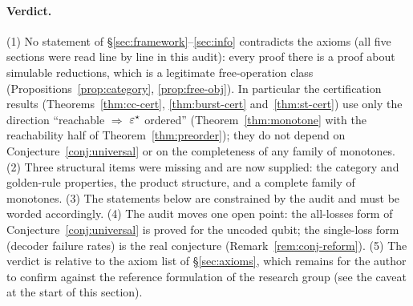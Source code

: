 \paragraph{Verdict.} (1) No statement of \S\ref{sec:framework}--\ref{sec:info} contradicts the axioms (all five sections were read line by line in this audit): every proof there is a proof about simulable reductions, which is a legitimate free-operation class (Propositions~\ref{prop:category}, \ref{prop:free-obj}). In particular the certification results (Theorems~\ref{thm:cc-cert}, \ref{thm:burst-cert} and~\ref{thm:st-cert}) use only the direction ``reachable $\Rightarrow$ $\varepsilon^{\star}$ ordered'' (Theorem~\ref{thm:monotone} with the reachability half of Theorem~\ref{thm:preorder}); they do not depend on Conjecture~\ref{conj:universal} or on the completeness of any family of monotones.
(2) Three structural items were missing and are now supplied: the category and golden-rule properties, the product structure, and a complete family of monotones.
(3) The statements below are constrained by the audit and must be worded accordingly.
(4) The audit moves one open point: the all-losses form of Conjecture~\ref{conj:universal} is proved for the uncoded qubit; the single-loss form (decoder failure rates) is the real conjecture (Remark~\ref{rem:conj-reform}).
(5) The verdict is relative to the axiom list of \S\ref{sec:axioms}, which remains for the author to confirm against the reference formulation of the research group (see the caveat at the start of this section).

